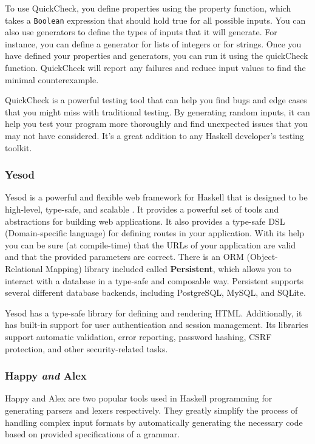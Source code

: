 \documentclass[a4paper, titlepage, twoside]{article}
\begin{document}
To use QuickCheck, you define properties using the property function, which takes a \texttt{Boolean} expression that should hold true for all possible inputs. You can also use generators to define the types of inputs that it will generate. For instance, you can define a generator for lists of integers or for strings. Once you have defined your properties and generators, you can run it using the quickCheck function. QuickCheck will report any failures and reduce input values to find the minimal counterexample.

QuickCheck is a powerful testing tool that can help you find bugs and edge cases that you might miss with traditional testing. By generating random inputs, it can help you test your program more thoroughly and find unexpected issues that you may not have considered. It's a great addition to any Haskell developer's testing toolkit.

\subsubsection{Yesod}
\label{sec:org87b5090}

Yesod is a powerful and flexible web framework for Haskell that is designed to be high-level, type-safe, and scalable \autocite{yesodYesodWebFramework2023}. It provides a powerful set of tools and abstractions for building web applications. It also provides a type-safe DSL (Domain-specific language) for defining routes in your application. With its help you can be sure (at compile-time) that the URLs of your application are valid and that the provided parameters are correct. There is an ORM (Object-Relational Mapping) library included called \textbf{Persistent}, which allows you to interact with a database in a type-safe and composable way. Persistent supports several different database backends, including PostgreSQL, MySQL, and SQLite.

Yesod has a type-safe library for defining and rendering HTML. Additionally, it has built-in support for user authentication and session management. Its libraries support automatic validation, error reporting, password hashing, CSRF protection, and other security-related tasks.

\subsubsection{Happy \emph{and} Alex}
\label{sec:org6b9c2e7}

Happy and Alex are two popular tools used in Haskell programming for generating parsers and lexers respectively. They greatly simplify the process of handling complex input formats by automatically generating the necessary code based on provided specifications of a grammar.
\end{document}
